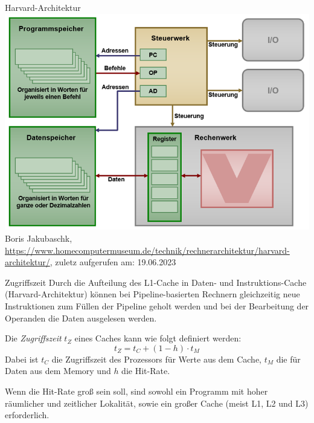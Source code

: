 \begin{example}[Cachehierarchie]{Harvard-Architektur}
  \includegraphics[width=\textwidth]{images/harvard_architektur.png}
  Boris Jakubaschk, \url{https://www.homecomputermuseum.de/technik/rechnerarchitektur/harvard-architektur/}, zuletz aufgerufen am: 19.06.2023
\end{example}

\begin{defi}[Cache]{Zugriffszeit}
    Durch die Aufteilung des L1-Cache in Daten- und Instruktions-Cache (Harvard-Architektur) können bei Pipeline-basierten Rechnern gleichzeitig neue Instruktionen zum Füllen der Pipeline geholt werden und bei der Bearbeitung der Operanden die Daten ausgelesen werden.

    Die \emph{Zugriffszeit} $t_Z$ eines Caches kann wie folgt definiert werden:
    \[
        t_Z = t_{C} + (1 - h) \cdot t_{M}
    \]
    Dabei ist $t_C$ die Zugriffszeit des Prozessors für Werte aus dem Cache, $t_M$ die für Daten aus dem Memory und $h$ die Hit-Rate.

    Wenn die Hit-Rate groß sein soll, sind sowohl ein Programm mit hoher räumlicher und zeitlicher Lokalität, sowie ein großer Cache (meist L1, L2 und L3) erforderlich.
\end{defi}

